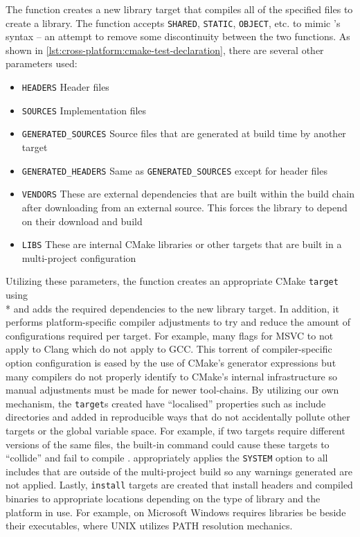 The function  creates a new library target that compiles all of the specified files to create a library. The function accepts \texttt{SHARED}, \texttt{STATIC}, \texttt{OBJECT}, etc. to mimic 's syntax \cite{CMake:add_library}  -- an attempt to remove some discontinuity between the two functions. As shown in \cref{lst:cross-platform:cmake-test-declaration}, there are several other parameters used: 
\begin{itemize}
    \item \texttt{HEADERS} Header files
    \item \texttt{SOURCES} Implementation files
    \item \texttt{GENERATED\_SOURCES} Source files that are generated at build time by another target
    \item \texttt{GENERATED\_HEADERS} Same as \texttt{GENERATED\_SOURCES} except for header files
    \item \texttt{VENDORS} These are external dependencies that are built within the build chain after downloading from an external source. This forces the library to depend on their download and build
    \item \texttt{LIBS} These are internal CMake libraries or other targets that are built in a multi-project configuration
\end{itemize}
Utilizing these parameters, the function creates an appropriate CMake \texttt{target} using \\*  and adds the required dependencies to the new library target. In addition, it performs platform-specific compiler adjustments to try and reduce the amount of configurations required per target. For example, many flags for MSVC to not apply to Clang which do not apply to GCC. This torrent of compiler-specific option configuration is eased by the use of CMake's generator expressions \cite{CMake:generator-expressions} but many compilers do not properly identify to CMake's internal infrastructure so manual adjustments must be made for newer tool-chains. By utilizing our own mechanism, the \texttt{target}s created have ``localised'' properties such as include directories and  added in reproducible ways that do not accidentally pollute other targets or the global variable space. For example, if two targets require different versions of the same files, the built-in  command could cause these targets to ``collide'' and fail to compile \cite{CMake:include-directories}.  appropriately applies the \texttt{SYSTEM} option to all includes that are outside of the multi-project build so any warnings generated are not applied. Lastly, \texttt{install} targets are created that install headers and compiled binaries to appropriate locations depending on the type of library and the platform in use. For example, on Microsoft Windows requires libraries be beside their executables, where UNIX utilizes PATH resolution mechanics.


